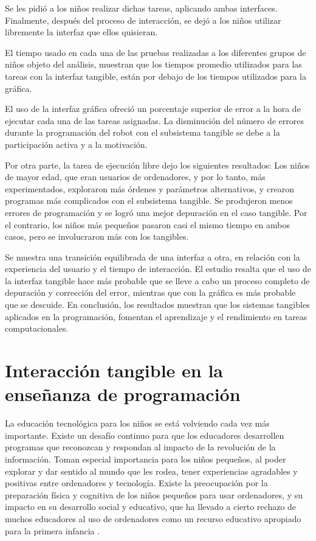 Se les pidió a los niños realizar dichas tareas, aplicando ambas interfaces. Finalmente, después del proceso de interacción, se dejó a los niños utilizar libremente la interfaz que ellos quisieran. 

El tiempo usado en cada una de las pruebas realizadas a los diferentes grupos de niños objeto del análisis, muestran que los tiempos promedio utilizados para las tareas con la interfaz tangible, están por debajo de los tiempos utilizados para la gráfica.

El uso de la interfaz gráfica ofreció un porcentaje superior de error a la hora de ejecutar cada una de las tareas asignadas. La disminución del número de errores durante la programación del robot con el subsistema tangible se debe a la participación activa y a la motivación.

Por otra parte, la tarea de ejecución libre dejo los siguientes resultados:
Los niños de mayor edad, que eran usuarios de ordenadores, y por lo tanto, más experimentados, exploraron más órdenes y parámetros alternativos, y crearon programas más complicados con el subsistema tangible. Se produjeron menos errores de programación y se logró una mejor depuración en el caso tangible.
Por el contrario, los niños más pequeños pasaron casi el mismo tiempo en ambos casos, pero se involucraron más con los tangibles.

Se muestra una transición equilibrada de una interfaz a otra, en relación con la experiencia del usuario y el tiempo de interacción.
El estudio resalta que el uso de la interfaz tangible hace más probable que se lleve a cabo un proceso completo de depuración y corrección del error, mientras que con la gráfica es más probable que se descuide.
En conclusión, los resultados muestran que los sistemas tangibles aplicados en la programación, fomentan el aprendizaje y el rendimiento en tareas computacionales.




\section{Interacción tangible en la enseñanza de programación}

La educación tecnológica para los niños se está volviendo cada vez más importante. Existe un desafío continuo para que los educadores desarrollen programas que reconozcan y respondan al impacto de la revolución de la información. Toman especial importancia para los niños pequeños, al poder explorar y dar sentido al mundo que les rodea, tener experiencias agradables y positivas entre ordenadores y tecnología. Existe la preocupación por la preparación física y cognitiva de los niños pequeños para usar ordenadores, y su impacto en su desarrollo social y educativo, que ha llevado a cierto rechazo de muchos educadores al uso de ordenadores como un recurso educativo apropiado para la primera infancia \cite{Bailey}.

